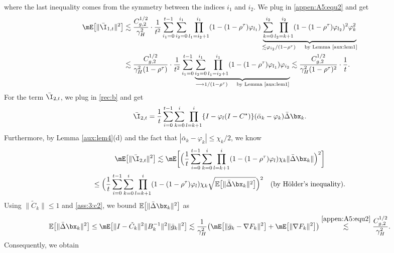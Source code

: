 where the last inequality comes from the symmetry between the indices $i_1$ and $i_2$. We plug in \eqref{appen:A5:equ2} and get
\begin{align}\label{appen:A5:equ12}
\mE\big[\|\bar{\I}_{1,t}\|^2\big] & \lesssim \frac{C_{g,2}^{1/2}}{\gamma_H^2} \cdot \frac{1}{t^2}\sum_{i_1=0}^{t-1} \sum_{i_2=0}^{i_1}\prod_{l_1=i_2+1}^{i_1}(1- (1-\rho^\tau)\varphi_{l_1}) \underbrace{\sum_{k=0}^{i_2} \prod_{l_2=k+1}^{i_2}(1- (1-\rho^\tau)\varphi_{l_2})^2 \varphi_k^2}_{\lesssim \varphi_{i_2}/(1-\rho^\tau)\quad\text{ by Lemma \ref{aux:lem1}}} \nonumber\\
& \lesssim \frac{C_{g,2}^{1/2}}{\gamma_H^2(1-\rho^\tau)} \cdot \frac{1}{t^2}\sum_{i_1=0}^{t-1} \underbrace{\sum_{i_2=0}^{i_1}\prod_{l_1=i_2+1}^{i_1}(1- (1-\rho^\tau)\varphi_{l_1})\varphi_{i_2}}_{\longrightarrow 1/(1-\rho^{\tau})\quad\text{ by Lemma \ref{aux:lem1}}}\lesssim  \frac{C_{g,2}^{1/2}}{\gamma_H^2(1-\rho^\tau)^2} \cdot \frac{1}{t}.
\end{align}
For the term $\bar{\I}_{2,t}$, we plug in \eqref{rec:b} and get
\begin{equation*}
\bar{\I}_{2, t}=\frac{1}{t} \sum_{i=0}^{t-1} \sum_{k=0}^i \prod_{l=k+1}^i \{I-\varphi_l (I-C^\star)\}(\bar{\alpha}_k- \varphi_k) \bar{\Delta}\bx_k.
\end{equation*}
Furthermore, by Lemma \ref{aux:lem4}(d) and the fact that $|\bar{\alpha}_k-\varphi_k|\leq \chi_k/2$, we know
\begin{multline}\label{appen:A5:equ8}
\mE\big[\|\bar{\I}_{2, t}\|^2\big] \lesssim 
\mE\bigg[\Big(\frac{1}{t}\sum_{i=0}^{t-1} \sum_{k=0}^i \prod_{l=k+1}^i (1-(1-\rho^\tau)\varphi_l)\chi_k \|\bar{\Delta}\bx_k\|\Big)^2\bigg]\\
\leq \Big(\frac{1}{t}\sum_{i=0}^{t-1} \sum_{k=0}^i \prod_{l=k+1}^i (1-(1-\rho^\tau)\varphi_l) \chi_k\sqrt{\mathbb{E}\big[\|\bar{\Delta}\bx_k\|^2\big]}\Big)^2\quad \text{(by H\"older's inequality)}.
\end{multline}
Using $\|\tilde{C}_k\|\leq 1$ and \eqref{ass:3:c2}, we bound $\mathbb{E}\big[\|\bar{\Delta}\bx_k\|^2\big]$ as
\begin{equation}\label{appen:A5:equ5}
\mathbb{E}\big[\|\bar{\Delta}\bx_k\|^2\big]\leq \mE\big[\|I-\tilde{C}_k\|^2\|B_k^{-1}\|^2\|\bar{g}_k\|^2\big] \lesssim \frac{1}{\gamma_H^2}\big(\mE\big[\|\bar{g}_k-\nabla F_k\|^2\big]+\mE\big[\|\nabla F_k\|^2\big]\big)
\stackrel{\eqref{appen:A5:equ2}}{\lesssim} \frac{C_{g,2}^{1/2}}{\gamma_H^2}.
\end{equation}
Consequently, we obtain
